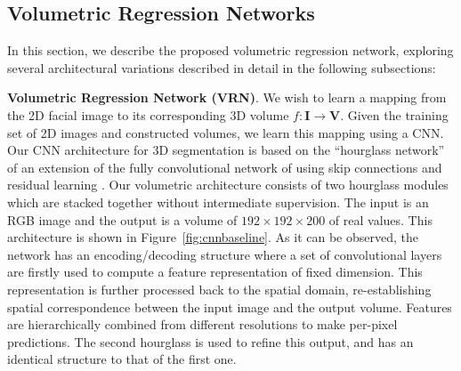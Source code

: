\subsection{Volumetric Regression Networks}


In this section, we describe the proposed volumetric regression
network, exploring several architectural variations described in
detail in the following subsections:

\textbf{Volumetric Regression Network (VRN)}. We wish to learn a
mapping from the 2D facial image to its corresponding 3D volume
$f: \mathbf{I} \rightarrow \mathbf{V}$. Given the training set of 2D
images and constructed volumes, we learn this mapping using a CNN. Our
CNN architecture for 3D segmentation is based on the ``hourglass
network'' of \cite{newell2016stacked} an extension of the fully
convolutional network of \cite{long2015fully} using skip connections
and residual learning \cite{he2015deep}. Our volumetric architecture
consists of two hourglass modules which are stacked together without
intermediate supervision. The input is an RGB image and the output is
a volume of $192\times 192\times 200$ of real values. This
architecture is shown in Figure~\ref{fig:cnnbaseline}. As it can be
observed, the network has an encoding/decoding structure where a set
of convolutional layers are firstly used to compute a feature
representation of fixed dimension. This representation is further
processed back to the spatial domain, re-establishing spatial
correspondence between the input image and the output volume. Features
are hierarchically combined from different resolutions to make
per-pixel predictions. The second hourglass is used to refine this
output, and has an identical structure to that of the first one.

